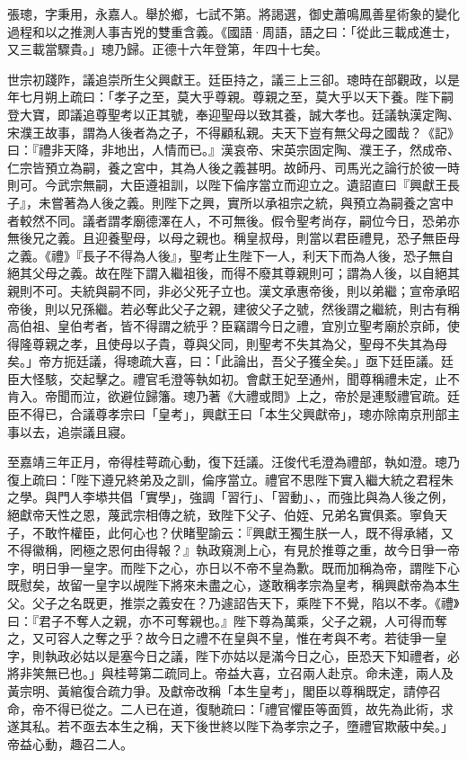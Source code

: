 
\begin{pinyinscope}
張璁，字秉用，永嘉人。舉於鄉，七試不第。將謁選，御史蕭鳴鳳善星術象的變化過程和以之推測人事吉兇的雙重含義。《國語·周語，語之曰：「從此三載成進士，又三載當驟貴。」璁乃歸。正德十六年登第，年四十七矣。

世宗初踐阼，議追崇所生父興獻王。廷臣持之，議三上三卻。璁時在部觀政，以是年七月朔上疏曰：「孝子之至，莫大乎尊親。尊親之至，莫大乎以天下養。陛下嗣登大寶，即議追尊聖考以正其號，奉迎聖母以致其養，誠大孝也。廷議執漢定陶、宋濮王故事，謂為人後者為之子，不得顧私親。夫天下豈有無父母之國哉？《記》曰：『禮非天降，非地出，人情而已。』漢哀帝、宋英宗固定陶、濮王子，然成帝、仁宗皆預立為嗣，養之宮中，其為人後之義甚明。故師丹、司馬光之論行於彼一時則可。今武宗無嗣，大臣遵祖訓，以陛下倫序當立而迎立之。遺詔直曰『興獻王長子』，未嘗著為人後之義。則陛下之興，實所以承祖宗之統，與預立為嗣養之宮中者較然不同。議者謂孝廟德澤在人，不可無後。假令聖考尚存，嗣位今日，恐弟亦無後兄之義。且迎養聖母，以母之親也。稱皇叔母，則當以君臣禮見，恐子無臣母之義。《禮》『長子不得為人後』，聖考止生陛下一人，利天下而為人後，恐子無自絕其父母之義。故在陛下謂入繼祖後，而得不廢其尊親則可；謂為人後，以自絕其親則不可。夫統與嗣不同，非必父死子立也。漢文承惠帝後，則以弟繼；宣帝承昭帝後，則以兄孫繼。若必奪此父子之親，建彼父子之號，然後謂之繼統，則古有稱高伯祖、皇伯考者，皆不得謂之統乎？臣竊謂今日之禮，宜別立聖考廟於京師，使得隆尊親之孝，且使母以子貴，尊與父同，則聖考不失其為父，聖母不失其為母矣。」帝方扼廷議，得璁疏大喜，曰：「此論出，吾父子獲全矣。」亟下廷臣議。廷臣大怪駭，交起擊之。禮官毛澄等執如初。會獻王妃至通州，聞尊稱禮未定，止不肯入。帝聞而泣，欲避位歸籓。璁乃著《大禮或問》上之，帝於是連駁禮官疏。廷臣不得已，合議尊孝宗曰「皇考」，興獻王曰「本生父興獻帝」，璁亦除南京刑部主事以去，追崇議且寢。

至嘉靖三年正月，帝得桂萼疏心動，復下廷議。汪俊代毛澄為禮部，執如澄。璁乃復上疏曰：「陛下遵兄終弟及之訓，倫序當立。禮官不思陛下實入繼大統之君程朱之學。與門人李塨共倡「實學」，強調「習行」、「習動」、，而強比與為人後之例，絕獻帝天性之恩，蔑武宗相傳之統，致陛下父子、伯姪、兄弟名實俱紊。寧負天子，不敢忤權臣，此何心也？伏睹聖諭云：『興獻王獨生朕一人，既不得承緒，又不得徽稱，罔極之恩何由得報？』執政窺測上心，有見於推尊之重，故今日爭一帝字，明日爭一皇字。而陛下之心，亦日以不帝不皇為歉。既而加稱為帝，謂陛下心既慰矣，故留一皇字以覘陛下將來未盡之心，遂敢稱孝宗為皇考，稱興獻帝為本生父。父子之名既更，推崇之義安在？乃遽詔告天下，乘陛下不覺，陷以不孝。《禮》曰：『君子不奪人之親，亦不可奪親也。』陛下尊為萬乘，父子之親，人可得而奪之，又可容人之奪之乎？故今日之禮不在皇與不皇，惟在考與不考。若徒爭一皇字，則執政必姑以是塞今日之議，陛下亦姑以是滿今日之心，臣恐天下知禮者，必將非笑無已也。」與桂萼第二疏同上。帝益大喜，立召兩人赴京。命未達，兩人及黃宗明、黃綰復合疏力爭。及獻帝改稱「本生皇考」，閣臣以尊稱既定，請停召命，帝不得已從之。二人已在道，復馳疏曰：「禮官懼臣等面質，故先為此術，求遂其私。若不亟去本生之稱，天下後世終以陛下為孝宗之子，墮禮官欺蔽中矣。」帝益心動，趣召二人。


\end{pinyinscope}
